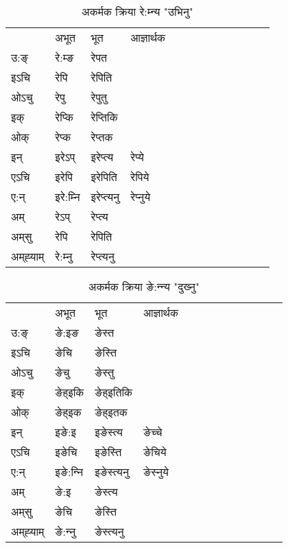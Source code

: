 \begin{table}[H]
\centering
\caption{\label{ep.vi} अकर्मक क्रिया  रे:म्‍न्य  "उभिनु"  }
\begin{tabular}{l|l|l|l|l|l|l|l|l|l|l|l|l}  \toprule
&अभूत & भूत & आज्ञार्थक \\ 
उ:ङ्‌ &रे:म्ङ &रेपत \\ 
इऽचि &रेपि &रेपिति   \\ 
ओऽचु &रेपु &रेपुतु   \\ 
इक् &रेप्कि &रेप्‍तिकि   \\ 
ओक् &रेप्क &रेप्‍तक   \\ 
इन् & इरेऽप् & इरेप्‍त्य &रेप्ये  \\ 
एऽचि & इरेपि & इरेपिति &रेपिये    \\ 
ए:न् & इरे:म्‍नि  & इरेप्‍त्यनु &रेप्‍नुये  \\ 
अम् & रेऽप् & रेप्‍त्य   \\ 
अम्‌सु & रेपि & रेपिति   \\ 
अम्‌ह्‍याम् & रे:म्‍नु  & रेप्‍त्यनु \\ 
\bottomrule
\end{tabular}
\end{table}


\begin{table}[H]
\centering
\caption{\label{et.vi} अकर्मक क्रिया  ङे:न्‍न्य  "दुख्‍नु"  }
\begin{tabular}{l|l|l|l|l|l|l|l|l|l|l|l|l}  \toprule
&अभूत & भूत & आज्ञार्थक \\ 
उ:ङ्‌ &ङे:इङ &ङेस्त \\ 
इऽचि &ङेचि &ङेस्ति   \\ 
ओऽचु &ङेचु &ङेस्तु   \\ 
इक् &ङेह्इकि &ङेह्इतिकि   \\ 
ओक् &ङेह्इक &ङेह्इतक   \\ 
इन् & इङे:इ & इङेस्त्य &ङेच्‍चे  \\ 
एऽचि & इङेचि & इङेस्ति &ङेचिये    \\ 
ए:न् & इङे:न्‍नि  & इङेस्त्यनु &ङेस्‍नुये  \\ 
अम् & ङे:इ & ङेस्त्य   \\ 
अम्‌सु & ङेचि & ङेस्ति   \\ 
अम्‌ह्‍याम् & ङे:न्‍नु  & ङेस्त्यनु \\ 
\bottomrule
\end{tabular}
\end{table}


